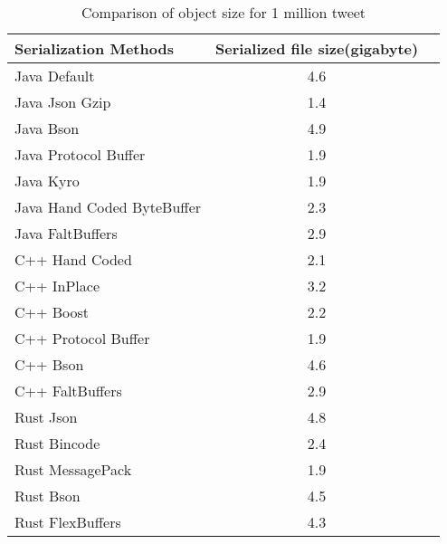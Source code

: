 \begin{table}
	\centering
	\caption{Comparison of object size for 1 million tweet }
	\label{tbl:object_size}
	\begin{adjustbox}{width=\columnwidth,center}	
		
		\begin{tabular}{|l|c|c|} \hline
		 \textbf{Serialization Methods} & \textbf{Serialized file size(gigabyte)}\\ \hline
			Java Default  & 4.6 \\ \hline	
			Java Json Gzip  & 1.4 \\ \hline	
			Java Bson  & 4.9 \\ \hline	
			Java Protocol Buffer  & 1.9 \\ \hline	
			Java Kyro  & 1.9 \\ \hline	
			Java Hand Coded ByteBuffer  & 2.3 \\ \hline	
			Java FaltBuffers  & 2.9 \\ \hline	
			C++ Hand Coded  & 2.1 \\ \hline	
			C++ InPlace  & 3.2 \\ \hline	
			C++ Boost  & 2.2 \\ \hline	
			C++ Protocol Buffer  & 1.9 \\ \hline
			C++ Bson  & 4.6 \\ \hline	
			C++ FaltBuffers  & 2.9 \\ \hline	
			Rust Json  & 4.8 \\ \hline
			Rust Bincode  & 2.4 \\ \hline			
			Rust MessagePack  & 1.9 \\ \hline			
			Rust Bson  & 4.5 \\ \hline			
			Rust FlexBuffers  & 4.3 \\ 						
			\hline\end{tabular}
	\end{adjustbox}
\end{table}


